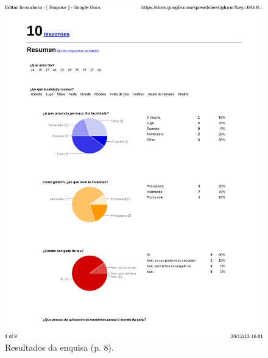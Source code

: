 \begin{figure}
 \centering
 \includegraphics[scale=0.7,page=8,keepaspectratio=true,clip,trim=0cm 0.5cm 0cm 0.5cm]{./imagenes/enquisa.pdf}
 \caption{Resultados da enquisa (p. 8).}
 \label{figura:ResultadosEnquisa8}
\end{figure}

